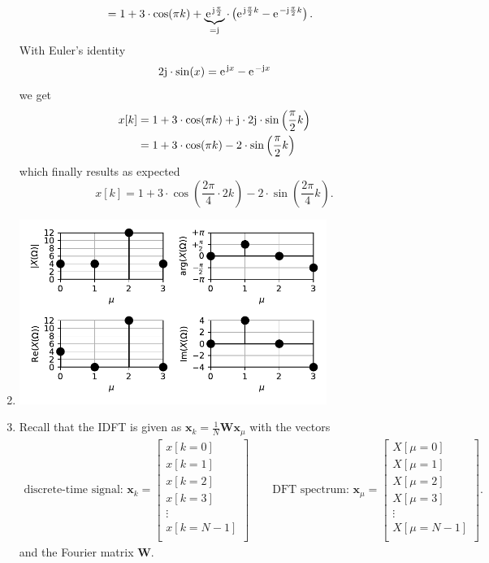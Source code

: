 \documentclass[11pt,a4paper,DIV=12]{scrartcl}
\begin{document}
\begin{Loesung}
\begin{enumerate}[label=\alph*)]
\begin{align}
	&=1+3\cdot\cos(\pi k)+\underbrace{\e^{\im\frac{\pi}{2}}}_{=\im}\cdot\left(\e^{\im\frac{\pi}{2}k}-\e^{-\im\frac{\pi}{2}k}\right).\nonumber
	\end{align}
 With Euler's identity
	\begin{equation}
	2\im\cdot\sin(x)=\e^{\im x}-\e^{-\im x}\nonumber
	\end{equation}
	we get
	\begin{align}
	x[k]&=1+3\cdot\cos(\pi k)+\im\cdot2\im\cdot\sin\left(\frac{\pi}{2}k\right)\nonumber\\
	&=1+3\cdot\cos(\pi k)-2\cdot\sin\left(\frac{\pi}{2}k\right)\nonumber
	\end{align}
	which finally results as expected
	\begin{equation}
	x[k]=1+3\cdot\cos\left(\frac{2\pi}{4}\cdot2k\right)-2\cdot\sin\left(\frac{2\pi}{4}k\right).\nonumber
	\end{equation}
	\item \text{}
	\begin{center}%
		\includegraphics[width=10cm]{graphics/UE1_Exercise2_IDFT.pdf}%
	\end{center}%
	\item
  Recall that the IDFT is given as $\bm x_k = \frac{1}{N} \bm W \bm x_\mu$ with
  the vectors
  \begin{align}
  \text{discrete-time signal: }
  \bm{x}_k =
  \begin{bmatrix}
  x[k=0]\\
  x[k=1]\\
  x[k=2]\\
  x[k=3]\\
  \vdots\\
  x[k=N-1]\\
  \end{bmatrix}\qquad
  \text{DFT spectrum: }
  \bm{x}_\mu =
  \begin{bmatrix}
  X[\mu=0]\\
  X[\mu=1]\\
  X[\mu=2]\\
  X[\mu=3]\\
  \vdots\\
  X[\mu=N-1]\\
  \end{bmatrix}.
  \end{align}
  and the Fourier matrix $\bm W$.


\end{enumerate}
\end{Loesung}
\end{document}
